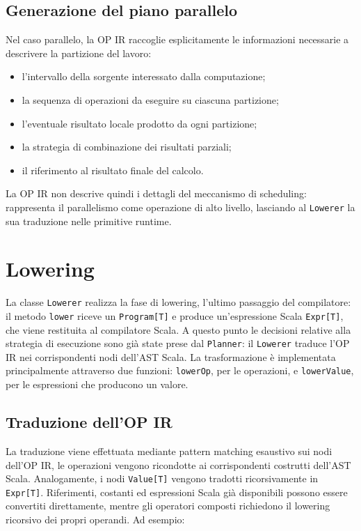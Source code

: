 \documentclass[a4paper,11pt]{report}
\theoremstyle{definition}
\begin{document}
\subsection{Generazione del piano parallelo}

Nel caso parallelo, la OP IR raccoglie esplicitamente le informazioni necessarie a descrivere la partizione del lavoro:

\begin{itemize}
  \item l'intervallo della sorgente interessato dalla computazione;
  \item la sequenza di operazioni da eseguire su ciascuna partizione;
  \item l'eventuale risultato locale prodotto da ogni partizione;
  \item la strategia di combinazione dei risultati parziali;
  \item il riferimento al risultato finale del calcolo.
\end{itemize}

La OP IR non descrive quindi i dettagli del meccanismo di scheduling: rappresenta il parallelismo come operazione di alto livello, lasciando al \texttt{Lowerer} la sua traduzione nelle primitive runtime.

\section{Lowering}
\label{sec:lowering}

La classe \texttt{Lowerer} realizza la fase di lowering, l'ultimo passaggio del compilatore: il metodo \texttt{lower} riceve un \texttt{Program[T]} e produce un'espressione Scala \texttt{Expr[T]}, che viene restituita al compilatore Scala. A questo punto le decisioni relative alla strategia di esecuzione sono già state prese dal \texttt{Planner}: il \texttt{Lowerer} traduce l'OP IR nei corrispondenti nodi dell'AST Scala. La trasformazione è implementata principalmente attraverso due funzioni: \texttt{lowerOp}, per le operazioni, e \texttt{lowerValue}, per le espressioni che producono un valore.

\subsection{Traduzione dell'OP IR}

La traduzione viene effettuata mediante pattern matching esaustivo sui nodi dell'OP IR, le operazioni vengono ricondotte ai corrispondenti costrutti dell'AST Scala. Analogamente, i nodi \texttt{Value[T]} vengono tradotti ricorsivamente in \texttt{Expr[T]}. Riferimenti, costanti ed espressioni Scala già disponibili possono essere convertiti direttamente, mentre gli operatori composti richiedono il lowering ricorsivo dei propri operandi. Ad esempio:
\end{document}
